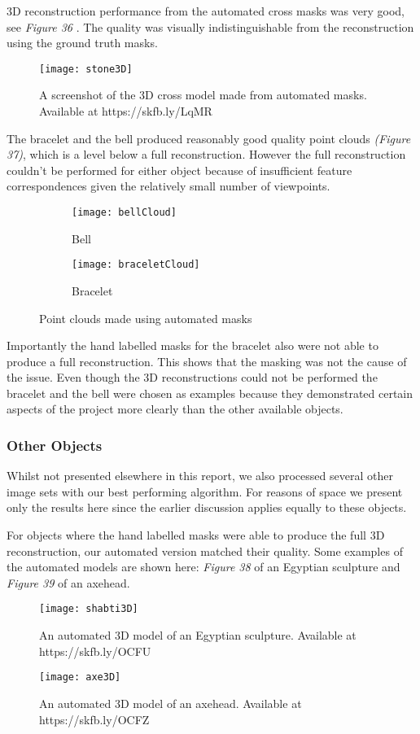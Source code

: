 \documentclass[12pt]{IIBproject}
\begin{document}
3D reconstruction performance from the automated cross masks was very good, see \emph{Figure 36} \cite{crossModel}. The quality was visually indistinguishable from the reconstruction using the ground truth masks.
\begin{figure}[H]
  
  \centering
    \texttt{[image: stone3D]}
    \caption{A screenshot of the 3D cross model made from automated masks. Available at https://skfb.ly/LqMR}
\end{figure}
The bracelet and the bell produced reasonably good quality point clouds \emph{(Figure 37)}, which is a level below a full reconstruction. However the full reconstruction couldn't be performed for either object because of insufficient feature correspondences given the relatively small number of viewpoints. 
\begin{figure}[H]
\centering
\begin{subfigure}{.45\textwidth}
  \centering
  \texttt{[image: bellCloud]}
  \caption{Bell}
  \label{fig:sub2}
\end{subfigure}
\begin{subfigure}{.45\textwidth}
  \centering
  \texttt{[image: braceletCloud]}
  \caption{Bracelet}
  \label{fig:sub2}
\end{subfigure}

\caption{Point clouds made using automated masks}
\label{fig:test}
\end{figure}

Importantly the hand labelled masks for the bracelet also were not able to produce a full reconstruction. This shows that the masking was not the cause of the issue. Even though the 3D reconstructions could not be performed the bracelet and the bell were chosen as examples because they demonstrated certain aspects of the project more clearly than the other available objects. 
\subsubsection{Other Objects}
Whilst not presented elsewhere in this report, we also processed several other image sets with our best performing algorithm. For reasons of space we present only the results here since the earlier discussion applies equally to these objects. 

For objects where the hand labelled masks were able to produce the full 3D reconstruction, our automated version matched their quality. Some examples of the automated models are shown here: \emph{Figure 38} of an Egyptian sculpture and \emph{Figure 39} of an axehead.
\begin{figure}[H]
  
  \centering
    \texttt{[image: shabti3D]}
    \caption{An automated 3D model of an Egyptian sculpture. Available at https://skfb.ly/OCFU}
\end{figure}
\begin{figure}[H]
  
  \centering
    \texttt{[image: axe3D]}
    \caption{An automated 3D model of an axehead. Available at https://skfb.ly/OCFZ}
\end{figure}
\end{document}
